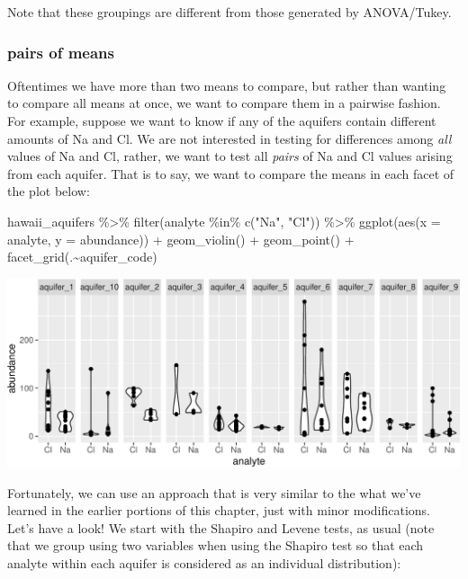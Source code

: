 \documentclass[
]{krantz}
\newenvironment{Shaded}{\begin{snugshade}}{\end{snugshade}}
\newcommand{\AttributeTok}[1]{\textcolor[rgb]{0.77,0.63,0.00}{#1}}
\newcommand{\FunctionTok}[1]{\textcolor[rgb]{0.00,0.00,0.00}{#1}}
\newcommand{\NormalTok}[1]{#1}
\newcommand{\SpecialCharTok}[1]{\textcolor[rgb]{0.00,0.00,0.00}{#1}}
\newcommand{\StringTok}[1]{\textcolor[rgb]{0.31,0.60,0.02}{#1}}
\begin{document}
Note that these groupings are different from those generated by ANOVA/Tukey.

\hypertarget{pairs-of-means}{%
\subsubsection{pairs of means}\label{pairs-of-means}}

Oftentimes we have more than two means to compare, but rather than wanting to compare all means at once, we want to compare them in a pairwise fashion. For example, suppose we want to know if any of the aquifers contain different amounts of Na and Cl. We are not interested in testing for differences among \emph{all} values of Na and Cl, rather, we want to test all \emph{pairs} of Na and Cl values arising from each aquifer. That is to say, we want to compare the means in each facet of the plot below:

\begin{Shaded}
\begin{Highlighting}[]
\NormalTok{hawaii\_aquifers }\SpecialCharTok{\%\textgreater{}\%}
  \FunctionTok{filter}\NormalTok{(analyte }\SpecialCharTok{\%in\%} \FunctionTok{c}\NormalTok{(}\StringTok{"Na"}\NormalTok{, }\StringTok{"Cl"}\NormalTok{)) }\SpecialCharTok{\%\textgreater{}\%}
  \FunctionTok{ggplot}\NormalTok{(}\FunctionTok{aes}\NormalTok{(}\AttributeTok{x =}\NormalTok{ analyte, }\AttributeTok{y =}\NormalTok{ abundance)) }\SpecialCharTok{+} \FunctionTok{geom\_violin}\NormalTok{() }\SpecialCharTok{+} \FunctionTok{geom\_point}\NormalTok{() }\SpecialCharTok{+} \FunctionTok{facet\_grid}\NormalTok{(.}\SpecialCharTok{\textasciitilde{}}\NormalTok{aquifer\_code)}
\end{Highlighting}
\end{Shaded}

\begin{center}\includegraphics[width=0.8\linewidth]{index_files/figure-latex/unnamed-chunk-154-1} \end{center}

Fortunately, we can use an approach that is very similar to the what we've learned in the earlier portions of this chapter, just with minor modifications. Let's have a look! We start with the Shapiro and Levene tests, as usual (note that we group using two variables when using the Shapiro test so that each analyte within each aquifer is considered as an individual distribution):
\end{document}
